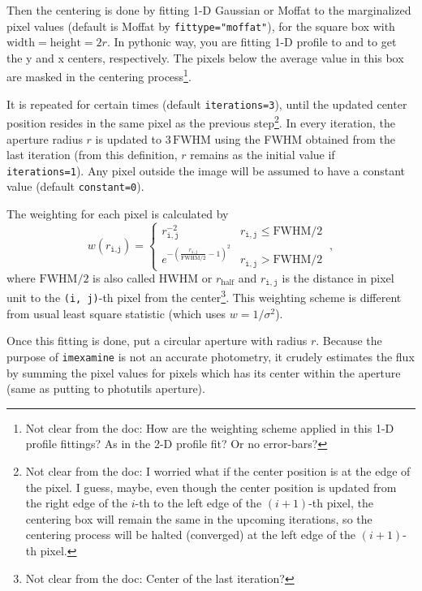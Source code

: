 Then the centering is done by fitting 1-D Gaussian or Moffat to the marginalized pixel values (default is Moffat by \texttt{fittype="moffat"}), for the square box with $ \mathrm{width} = \mathrm{height} = 2r $.  In pythonic way, you are fitting 1-D profile to  and  to get the y and x centers, respectively. The pixels below the average value in this box are masked in the centering process\footnote{Not clear from the doc: How are the weighting scheme applied in this 1-D profile fittings? As in the 2-D profile fit? Or no error-bars?}. 

It is repeated for certain times (default \texttt{iterations=3}), until the updated center position resides in the same pixel as the previous step\footnote{Not clear from the doc: I worried what if the center position is at the edge of the pixel. I guess, maybe, even though the center position is updated from the right edge of the $ i $-th to the left edge of the $ (i+1) $-th pixel, the centering box will remain the same in the upcoming iterations, so the centering process will be halted (converged) at the left edge of the $ (i+1) $-th pixel.}. In every iteration, the aperture radius $ r $ is updated to $ 3\, \mathrm{FWHM} $ using the FWHM obtained from the last iteration (from this definition, $ r $ remains as the initial value if \texttt{iterations=1}). Any pixel outside the image will be assumed to have a constant value (default \texttt{constant=0}). 

The weighting for each pixel is calculated by
\begin{equation}\label{eq: imexam weighting}
  w (r_{\texttt{i,j}}) = \left \{ 
  \begin{array}{cr}
    r_\mathtt{i,j}^{-2} & r_\mathtt{i,j} \le \mathrm{FWHM}/2 \\
    e^{-\left ( \frac{r_\mathtt{i,j}}{\mathrm{FWHM}/2} - 1 \right )^2} & r_\mathtt{i,j} > \mathrm{FWHM}/2
  \end{array}
  \right . ~,
\end{equation}
where $ \mathrm{FWHM}/2 $ is also called $ \mathrm{HWHM} $ or $ r_\mathrm{half} $ and $ r_\mathtt{i,j} $ is the distance in pixel unit to the \texttt{(i, j)}-th pixel from the center\footnote{Not clear from the doc: Center of the last iteration?}. This weighting scheme is different from usual least square statistic (which uses $ w = 1/\sigma^2 $). 

Once this fitting is done, put a circular aperture with radius $ r $. Because the purpose of \texttt{imexamine} is not an accurate photometry, it crudely estimates the flux by summing the pixel values for pixels which has its center within the aperture (same as putting  to photutils aperture). 

